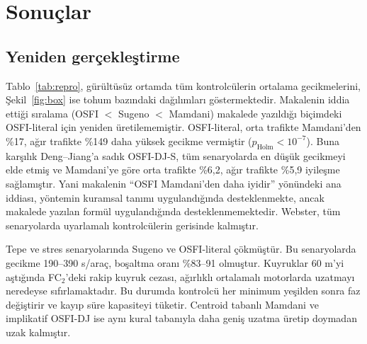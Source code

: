 \documentclass[11pt,a4paper]{article}
\theoremstyle{definition}
\newcommand{\osfis}{OSFI-DJ-S}
\begin{document}
\section{Sonuçlar}
\label{sec:results}

\subsection{Yeniden gerçekleştirme}

Tablo~\ref{tab:repro}, gürültüsüz ortamda tüm kontrolcülerin ortalama gecikmelerini, Şekil~\ref{fig:box} ise tohum bazındaki dağılımları göstermektedir. Makalenin iddia ettiği sıralama (OSFI $<$ Sugeno $<$ Mamdani) makalede yazıldığı biçimdeki OSFI-literal için yeniden üretilememiştir. OSFI-literal, orta trafikte Mamdani'den \%17, ağır trafikte \%149 daha yüksek gecikme vermiştir ($p_{\text{Holm}}<10^{-7}$). Buna karşılık Deng--Jiang'a sadık \osfis{}, tüm senaryolarda en düşük gecikmeyi elde etmiş ve Mamdani'ye göre orta trafikte \%6,2, ağır trafikte \%5,9 iyileşme sağlamıştır. Yani makalenin ``OSFI Mamdani'den daha iyidir'' yönündeki ana iddiası, yöntemin kuramsal tanımı uygulandığında desteklenmekte, ancak makalede yazılan formül uygulandığında desteklenmemektedir. Webster, tüm senaryolarda uyarlamalı kontrolcülerin gerisinde kalmıştır.

Tepe ve stres senaryolarında Sugeno ve OSFI-literal çökmüştür. Bu senaryolarda gecikme 190--390 s/araç, boşaltma oranı \%83--91 olmuştur. Kuyruklar 60 m'yi aştığında FC$_2$'deki rakip kuyruk cezası, ağırlıklı ortalamalı motorlarda uzatmayı neredeyse sıfırlamaktadır. Bu durumda kontrolcü her minimum yeşilden sonra faz değiştirir ve kayıp süre kapasiteyi tüketir. Centroid tabanlı Mamdani ve implikatif OSFI-DJ ise aynı kural tabanıyla daha geniş uzatma üretip doymadan uzak kalmıştır.
\end{document}
